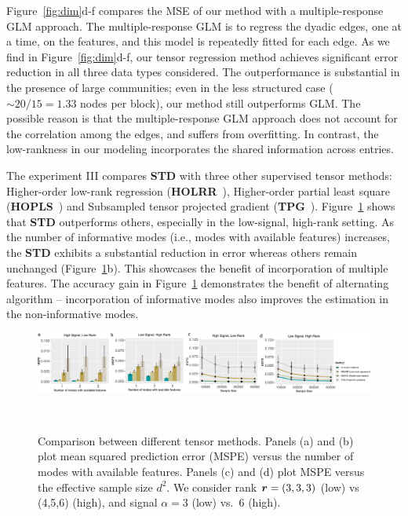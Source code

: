 \documentclass{article}
\theoremstyle{definition}
\theoremstyle{definition}
\begin{document}
Figure~\ref{fig:dim}d-f compares the MSE of our method with a multiple-response GLM approach. The multiple-response GLM is to regress the dyadic edges, one at a time, on the features, and this model is repeatedly fitted for each edge. As we find in Figure~\ref{fig:dim}d-f, our tensor regression method achieves significant error reduction in all three data types considered. The outperformance is substantial in the presence of large communities; even in the less structured case ($\sim 20/15=1.33$ nodes per block), our method still outperforms GLM. The possible reason is that the multiple-response GLM approach does not account for the correlation among the edges, and suffers from overfitting. In contrast, the low-rankness in our modeling incorporates the shared information across entries.

The experiment III compares {\bf STD} with three other supervised tensor methods: Higher-order low-rank regression ({\bf HOLRR}~\cite{rabusseau2016low}), Higher-order partial least square ({\bf HOPLS}~\cite{zhao2012higher}) and Subsampled tensor projected gradient ({\bf TPG}~\cite{yu2016learning}). Figure~\ref{fig:compare} shows that {\bf STD} outperforms others, especially in the low-signal, high-rank setting. As the number of informative modes (i.e., modes with available features) increases, the {\bf STD} exhibits a substantial reduction in error whereas others remain unchanged (Figure~\ref{fig:compare}b). This showcases the benefit of incorporation of multiple features. The accuracy gain in Figure~\ref{fig:compare} demonstrates the benefit of alternating algorithm -- incorporation of informative modes also improves the estimation in the non-informative modes. 

\begin{figure}[ht]
\centering
\includegraphics[width=14cm]{compare_alternative_w.pdf} 
\vspace{-.5cm}
\caption{\small Comparison between different tensor methods. Panels (a) and (b) plot mean squared prediction error (MSPE) versus the number of modes with available features. Panels (c) and (d) plot MSPE versus the effective sample size $d^2$. We consider rank $\bm{r}=(3,3,3)$ (low) vs (4,5,6)
 (high), and signal $\alpha =3 $ (low) vs.\ 6 (high).}~\label{fig:compare}
\vspace{-.5cm}
\end{figure}
\end{document}
